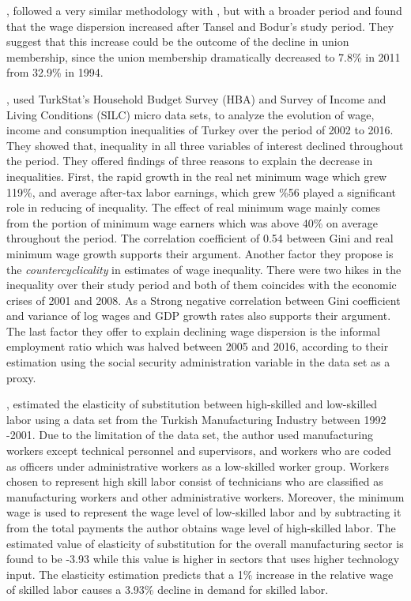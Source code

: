 \begin{onehalfspace}
\citet{2017DAS}, followed a very similar methodology with \citet{2012Tansel},
but with a broader period and found that the wage dispersion increased
after Tansel and Bodur's \citeyearpar{2012Tansel} study period. They
suggest that this increase could be the outcome of the decline in
union membership, since the union membership dramatically decreased
to 7.8\% in 2011 from 32.9\% in 1994.

\citet{2020Tamkoc}, used TurkStat's Household Budget Survey (HBA)
and Survey of Income and Living Conditions (SILC) micro data sets,
to analyze the evolution of wage, income and consumption inequalities
of Turkey over the period of 2002 to 2016. They showed that, inequality
in all three variables of interest declined throughout the period.
They offered findings of three reasons to explain the decrease in
inequalities. First, the rapid growth in the real net minimum wage
which grew 119\%, and average after-tax labor earnings, which grew
\%56 played a significant role in reducing of inequality. The effect
of real minimum wage mainly comes from the portion of minimum wage
earners which was above 40\% on average throughout the period. The
correlation coefficient of 0.54 between Gini and real minimum wage
growth supports their argument. Another factor they propose is the
\emph{countercyclicality }in estimates of wage inequality. There were
two hikes in the inequality over their study period and both of them
coincides with the economic crises of 2001 and 2008. As a Strong negative
correlation between Gini coefficient and variance of log wages and
GDP growth rates also supports their argument. The last factor they
offer to explain declining wage dispersion is the informal employment
ratio which was halved between 2005 and 2016, according to their estimation
using the social security administration variable in the data set
as a proxy.

\citet{Dervisen2011}, estimated the elasticity of substitution between
high-skilled and low-skilled labor using a data set from the Turkish
Manufacturing Industry between 1992 -2001. Due to the limitation of
the data set, the author used manufacturing workers except technical
personnel and supervisors, and workers who are coded as officers under
administrative workers as a low-skilled worker group. Workers chosen
to represent high skill labor consist of technicians who are classified
as manufacturing workers and other administrative workers. Moreover,
the minimum wage is used to represent the wage level of low-skilled
labor and by subtracting it from the total payments the author obtains
wage level of high-skilled labor. The estimated value of elasticity
of substitution for the overall manufacturing sector is found to be
-3.93 while this value is higher in sectors that uses higher technology
input. The elasticity estimation predicts that a 1\% increase in the
relative wage of skilled labor causes a 3.93\% decline in demand for
skilled labor.
\end{onehalfspace}

\newpage{}
